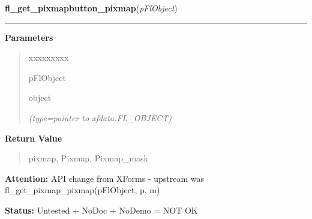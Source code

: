 \hspace{.8\funcindent}\begin{boxedminipage}{\funcwidth}

    \raggedright \textbf{fl\_get\_pixmapbutton\_pixmap}(\textit{pFlObject})

    \vspace{-1.5ex}

    \rule{\textwidth}{0.5\fboxrule}
\setlength{\parskip}{2ex}
\setlength{\parskip}{1ex}
      \textbf{Parameters}
      \vspace{-1ex}

      \begin{quote}
        \begin{Ventry}{xxxxxxxxx}

          \item[pFlObject]

          object

            {\it (type=pointer to xfdata.FL\_OBJECT)}

        \end{Ventry}

      \end{quote}

      \textbf{Return Value}
    \vspace{-1ex}

      \begin{quote}
      pixmap, Pixmap, Pixmap\_mask

      \end{quote}

\textbf{Attention:} API change from XForms - upstream was fl\_get\_pixmap\_pixmap(pFlObject, p,
m)



\textbf{Status:} Untested + NoDoc + NoDemo = NOT OK



    \end{boxedminipage}

    \label{xformslib:flbitmap:fl_read_pixmapfile}

    \vspace{0.5ex}

